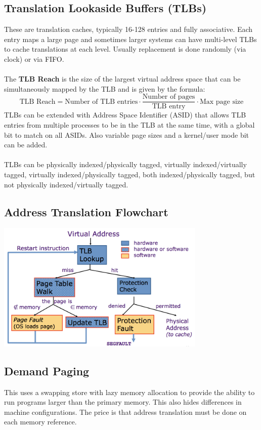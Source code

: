 \documentclass{article}
\begin{document}
\subsection{Translation Lookaside Buffers (TLBs)}
These are translation caches, typically 16-128 entries and fully associative. Each entry maps a large page and sometimes larger systems can have multi-level TLBs to cache translations at each level. Usually replacement is done randomly (via clock) or via FIFO. \\
\\
The \textbf{TLB Reach} is the size of the largest virtual address space that can be simultaneously mapped by the TLB and is given by the formula:
$$ \text{TLB Reach} = \text{Number of TLB entries} \cdot \frac{\text{Number of pages}}{\text{TLB entry}} \cdot \text{Max page size} $$
TLBs can be extended with Address Space Identifier (ASID) that allows TLB entries from multiple processes to be in the TLB at the same time, with a global bit to match on all ASIDs. Also variable page sizes and a kernel/user mode bit can be added. \\
\\
TLBs can be physically indexed/physically tagged, virtually indexed/virtually tagged, virtually indexed/physically tagged, both indexed/physically tagged, but not physically indexed/virtually tagged.

\subsection{Address Translation Flowchart}

\begin{center}
\includegraphics[width=0.75\textwidth]{addr-trans-flowchart}
\end{center}

\subsection{Demand Paging}
This uses a swapping store with lazy memory allocation to provide the ability to run programs larger than the primary memory. This also hides differences in machine configurations. The price is that address translation must be done on each memory reference.
\end{document}
